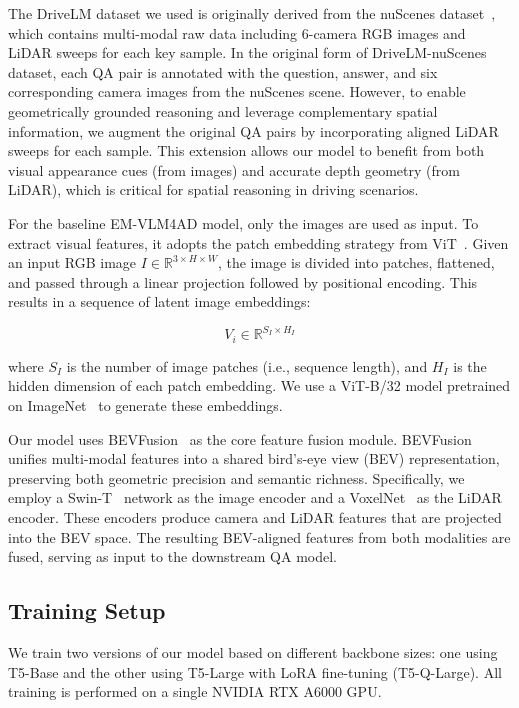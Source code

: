 \documentclass{article} %
\begin{document}
The DriveLM dataset we used is originally derived from the nuScenes dataset~\cite{Caesar2019nuScenesAM}, which contains multi-modal raw data including 6-camera RGB images and LiDAR sweeps for each key sample. In the original form of DriveLM-nuScenes dataset, each QA pair is annotated with the question, answer, and six corresponding camera images from the nuScenes scene. However, to enable geometrically grounded reasoning and leverage complementary spatial information, we augment the original QA pairs by incorporating aligned LiDAR sweeps for each sample. This extension allows our model to benefit from both visual appearance cues (from images) and accurate depth geometry (from LiDAR), which is critical for spatial reasoning in driving scenarios.

For the baseline EM-VLM4AD model, only the images are used as input. To extract visual features, it adopts the patch embedding strategy from ViT~\cite{Dosovitskiy2020AnII}. Given an input RGB image $I \in \mathbb{R}^{3 \times H \times W}$, the image is divided into patches, flattened, and passed through a linear projection followed by positional encoding. This results in a sequence of latent image embeddings:

\[
V_i \in \mathbb{R}^{S_I \times H_I}
\]

where $S_I$ is the number of image patches (i.e., sequence length), and $H_I$ is the hidden dimension of each patch embedding. We use a ViT-B/32 model pretrained on ImageNet~\cite{Deng2009ImageNetAL} to generate these embeddings.

Our model uses BEVFusion~\cite{Liu2022BEVFusionMM} as the core feature fusion module. BEVFusion unifies multi-modal features into a shared bird’s-eye view (BEV) representation, preserving both geometric precision and semantic richness. Specifically, we employ a Swin-T~\cite{Liu2021SwinTH} network as the image encoder and a VoxelNet~\cite{Zhou2017VoxelNetEL} as the LiDAR encoder. These encoders produce camera and LiDAR features that are projected into the BEV space. The resulting BEV-aligned features from both modalities are fused, serving as input to the downstream QA model.

\subsection{Training Setup}
We train two versions of our model based on different backbone sizes: one using T5-Base and the other using T5-Large with LoRA fine-tuning (T5-Q-Large). All training is performed on a single NVIDIA RTX A6000 GPU.
\end{document}

